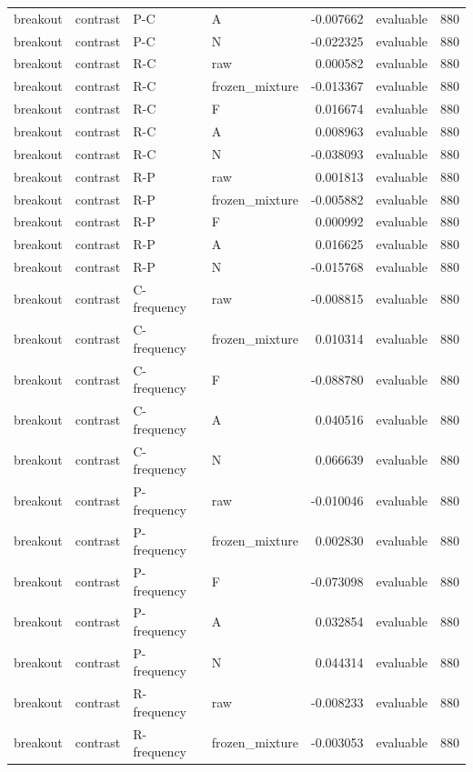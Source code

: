 \begin{longtable}{llllrlr}
breakout & contrast & P-C & A & -0.007662 & evaluable & 880 \\
breakout & contrast & P-C & N & -0.022325 & evaluable & 880 \\
breakout & contrast & R-C & raw & 0.000582 & evaluable & 880 \\
breakout & contrast & R-C & frozen\_mixture & -0.013367 & evaluable & 880 \\
breakout & contrast & R-C & F & 0.016674 & evaluable & 880 \\
breakout & contrast & R-C & A & 0.008963 & evaluable & 880 \\
breakout & contrast & R-C & N & -0.038093 & evaluable & 880 \\
breakout & contrast & R-P & raw & 0.001813 & evaluable & 880 \\
breakout & contrast & R-P & frozen\_mixture & -0.005882 & evaluable & 880 \\
breakout & contrast & R-P & F & 0.000992 & evaluable & 880 \\
breakout & contrast & R-P & A & 0.016625 & evaluable & 880 \\
breakout & contrast & R-P & N & -0.015768 & evaluable & 880 \\
breakout & contrast & C-frequency & raw & -0.008815 & evaluable & 880 \\
breakout & contrast & C-frequency & frozen\_mixture & 0.010314 & evaluable & 880 \\
breakout & contrast & C-frequency & F & -0.088780 & evaluable & 880 \\
breakout & contrast & C-frequency & A & 0.040516 & evaluable & 880 \\
breakout & contrast & C-frequency & N & 0.066639 & evaluable & 880 \\
breakout & contrast & P-frequency & raw & -0.010046 & evaluable & 880 \\
breakout & contrast & P-frequency & frozen\_mixture & 0.002830 & evaluable & 880 \\
breakout & contrast & P-frequency & F & -0.073098 & evaluable & 880 \\
breakout & contrast & P-frequency & A & 0.032854 & evaluable & 880 \\
breakout & contrast & P-frequency & N & 0.044314 & evaluable & 880 \\
breakout & contrast & R-frequency & raw & -0.008233 & evaluable & 880 \\
breakout & contrast & R-frequency & frozen\_mixture & -0.003053 & evaluable & 880 \\

\end{longtable}
